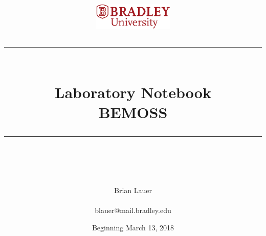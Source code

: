 \documentclass[fontsize=11pt, %
                             paper=letter, %
                             twoside, %
                             captions=tableheading,
                             index=totoc,
                             hyperref]{labbook}
\newcommand{\HRule}{\rule{\linewidth}{0.5mm}} %
\begin{document}


%

\title{
\begin{center}
\href{http://www.bradley.edu}{\includegraphics[height=0.5in]{figs/logoBU1-Print}}
\vskip10pt
\HRule \\[0.4cm]
{\Huge \bfseries Laboratory Notebook \\[0.5cm] \Large BEMOSS}\\[0.4cm] %
\HRule \\[1.5cm]
\end{center}
}
\author{\Huge Brian Lauer \\ \\ \LARGE blauer@mail.bradley.edu \\[2cm]} %
\date{Beginning March 13, 2018} %
\maketitle


\printindex
\tableofcontents %
\newpage %
\end{document}
